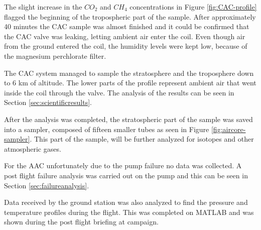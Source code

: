 The slight increase in the $CO_2$ and $CH_4$ concentrations in Figure \ref{fig:CAC-profile} flagged the beginning of the tropospheric part of the sample. After approximately 40 minutes the CAC sample was almost finished and it could be confirmed that the CAC valve was leaking, letting ambient air enter the coil. Even though air from the ground entered the coil, the humidity levels were kept low, because of the magnesium perchlorate filter.  

The CAC system managed to sample the stratosphere and the troposphere down to 6 km of altitude. The lower parts of the profile represent ambient air that went inside the coil through the valve. The analysis of the results can be seen in Section \ref{sec:scientificresults}.

After the analysis was completed, the stratospheric part of the sample was saved into a sampler, composed of fifteen smaller tubes as seen in Figure \ref{fig:aircore-sampler}. This part of the sample, will be further analyzed for isotopes and other atmospheric gases.

For the AAC unfortunately due to the pump failure no data was collected. A post flight failure analysis was carried out on the pump and this can be seen in Section \ref{sec:failureanalysis}.

Data received by the ground station was also analyzed to find the pressure and temperature profiles during the flight. This was completed on MATLAB and was shown during the post flight briefing at campaign.


